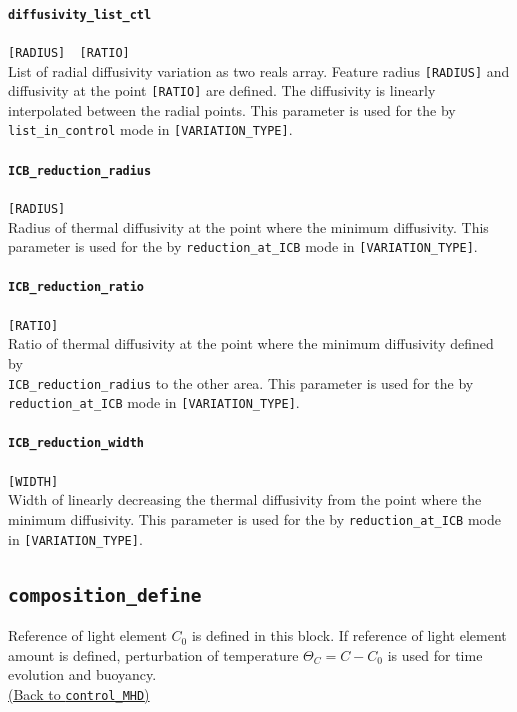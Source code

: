\paragraph{\tt diffusivity\_list\_ctl}
\label{href_t:diffusivity_list_ctl}
\verb|[RADIUS]  [RATIO]| \\
List of radial diffusivity variation as two reals array. Feature radius {\tt [RADIUS]} and diffusivity at the point {\tt [RATIO]} are defined. The diffusivity is linearly interpolated between the radial points. This parameter is used for the by {\tt list\_in\_control} mode in {\tt [VARIATION\_TYPE]}.


\paragraph{\tt ICB\_reduction\_radius}
\label{href_t:ICB_reduction_radius}
\verb|[RADIUS]| \\
Radius of thermal diffusivity at the point where the minimum diffusivity. This parameter is used for the by {\tt reduction\_at\_ICB} mode in {\tt [VARIATION\_TYPE]}.

\paragraph{\tt ICB\_reduction\_ratio}
\label{href_t:ICB_reduction_ratio}
\verb|[RATIO]| \\
Ratio of thermal diffusivity at the point where the minimum diffusivity defined by \\
{\tt ICB\_reduction\_radius} to the other area. This parameter is used for the by \\
{\tt reduction\_at\_ICB} mode in {\tt [VARIATION\_TYPE]}.


\paragraph{\tt ICB\_reduction\_width}
\label{href_t:ICB_reduction_width}
\verb|[WIDTH]| \\
Width of linearly decreasing the thermal diffusivity from the point where the minimum diffusivity. This parameter is used for the by {\tt reduction\_at\_ICB} mode in {\tt [VARIATION\_TYPE]}.

\subsection{\tt composition\_define}
\label{href_t:composition_define}
Reference of light element $C_{0}$ is defined in this block. If reference of light element amount is defined, perturbation of temperature $\Theta_{C} = C - C_{0}$ is used for time evolution and buoyancy. \\
\hyperref[href_i:composition_define]{(Back to {\tt control\_MHD})}

